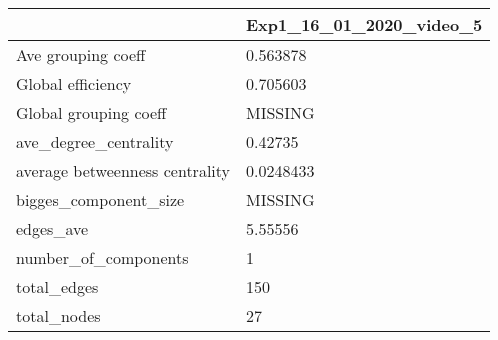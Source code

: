 \begin{tabular}{ll}
\toprule
{} & Exp1\_16\_01\_2020\_video\_5 \\
\midrule
Ave grouping coeff             &                0.563878 \\
Global efficiency              &                0.705603 \\
Global grouping coeff          &                 MISSING \\
ave\_degree\_centrality          &                 0.42735 \\
average betweenness centrality &               0.0248433 \\
bigges\_component\_size          &                 MISSING \\
edges\_ave                      &                 5.55556 \\
number\_of\_components           &                       1 \\
total\_edges                    &                     150 \\
total\_nodes                    &                      27 \\
\bottomrule
\end{tabular}
